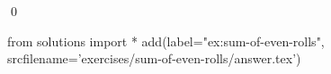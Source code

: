 
\begin{ex} 
  \label{ex:sum-of-even-rolls}
  
  \qed
\end{ex} 
\begin{python0}
from solutions import *
add(label="ex:sum-of-even-rolls",
    srcfilename='exercises/sum-of-even-rolls/answer.tex') 
\end{python0}
